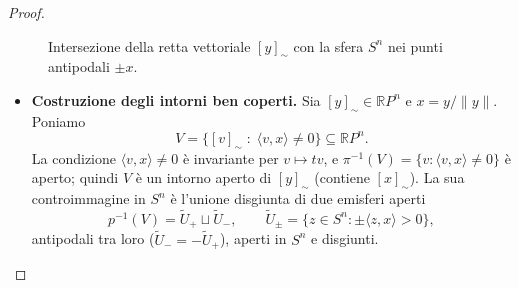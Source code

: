 \begin{proof}
\begin{figure}[H]
    \centering
    \caption{Intersezione della retta vettoriale $[y]_\sim$ con la sfera $S^n$ nei punti antipodali $\pm x$.}
\end{figure}

\begin{itemize}
    \item \textbf{Costruzione degli intorni ben coperti.} Sia $[y]_\sim \in \mathbb{R}P^n$ e $x = y/\|y\|$. Poniamo
    \[
    V = \{ [v]_\sim \;:\; \langle v, x \rangle \neq 0 \} \subseteq \mathbb{R}P^n .
    \]
    La condizione $\langle v,x\rangle \neq 0$ \`e invariante per $v \mapsto tv$, e $\pi^{-1}(V) = \{v : \langle v, x\rangle \neq 0\}$ \`e aperto; quindi $V$ \`e un intorno aperto di $[y]_\sim$ (contiene $[x]_\sim$). La sua controimmagine in $S^n$ \`e l'unione disgiunta di due emisferi aperti
    \[
    p^{-1}(V) = \widetilde{U}_+ \sqcup \widetilde{U}_-, \qquad \widetilde{U}_\pm = \{ z \in S^n : \pm\langle z, x \rangle > 0 \},
    \]
    antipodali tra loro ($\widetilde{U}_- = -\widetilde{U}_+$), aperti in $S^n$ e disgiunti.


\end{itemize}
\end{proof}
